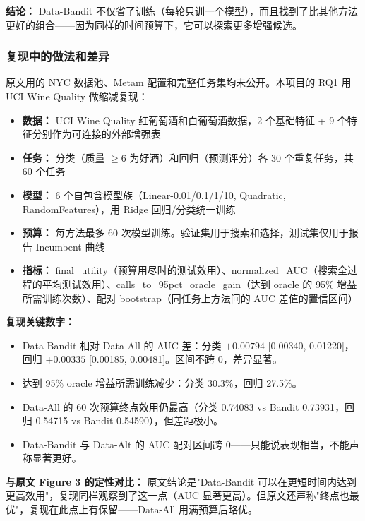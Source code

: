 \documentclass[12pt,a4paper]{article}
\theoremstyle{definition}
\begin{document}
\textbf{结论：} Data-Bandit 不仅省了训练（每轮只训一个模型），而且找到了比其他方法更好的组合——因为同样的时间预算下，它可以探索更多增强候选。

\subsubsection{复现中的做法和差异}

原文用的 NYC 数据池、Metam 配置和完整任务集均未公开。本项目的 RQ1 用 UCI Wine Quality 做缩减复现：

\begin{itemize}[leftmargin=*]
    \item \textbf{数据：} UCI Wine Quality 红葡萄酒和白葡萄酒数据，2 个基础特征 + 9 个特征分别作为可连接的外部增强表
    \item \textbf{任务：} 分类（质量 $\ge 6$ 为好酒）和回归（预测评分）各 30 个重复任务，共 60 个任务
    \item \textbf{模型：} 6 个自包含模型族（Linear-0.01/0.1/1/10, Quadratic, RandomFeatures），用 Ridge 回归/分类统一训练
    \item \textbf{预算：} 每方法最多 60 次模型训练。验证集用于搜索和选择，测试集仅用于报告 Incumbent 曲线
    \item \textbf{指标：} final\_utility（预算用尽时的测试效用）、normalized\_AUC（搜索全过程的平均测试效用）、calls\_to\_95pct\_oracle\_gain（达到 oracle 的 95\% 增益所需训练次数）、配对 bootstrap（同任务上方法间的 AUC 差值的置信区间）
\end{itemize}

\textbf{复现关键数字：}
\begin{itemize}[leftmargin=*]
    \item Data-Bandit 相对 Data-All 的 AUC 差：分类 $+0.00794$ [0.00340, 0.01220]，回归 $+0.00335$ [0.00185, 0.00481]。区间不跨 0，差异显著。
    \item 达到 95\% oracle 增益所需训练减少：分类 30.3\%，回归 27.5\%。
    \item Data-All 的 60 次预算终点效用仍最高（分类 0.74083 vs Bandit 0.73931，回归 0.54715 vs Bandit 0.54590），但差距极小。
    \item Data-Bandit 与 Data-Alt 的 AUC 配对区间跨 0——只能说表现相当，不能声称显著更好。
\end{itemize}

\textbf{与原文 Figure 3 的定性对比：} 原文结论是"Data-Bandit 可以在更短时间内达到更高效用"，复现同样观察到了这一点（AUC 显著更高）。但原文还声称"终点也最优"，复现在此点上有保留——Data-All 用满预算后略优。
\end{document}
